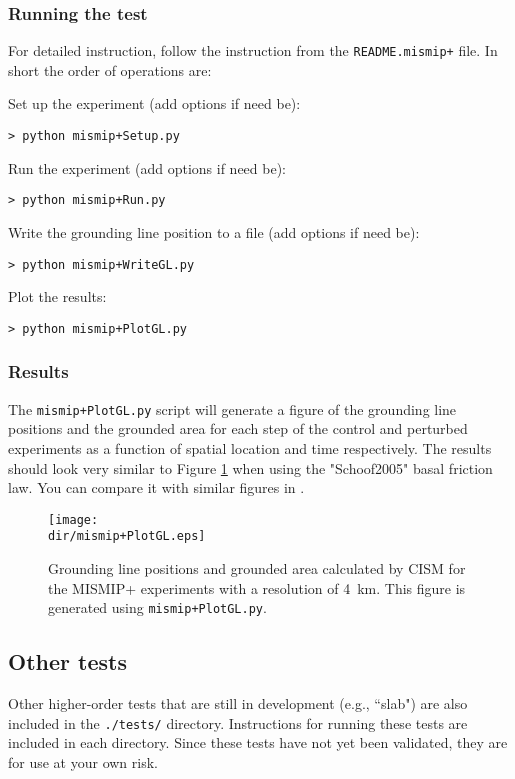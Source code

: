 \subsubsection{Running the test}
For detailed instruction, follow the instruction from the \texttt{README.mismip+} file. In short the order of operations are:

\noindent
Set up the experiment (add options if need be):

\texttt{> python mismip+Setup.py}

\noindent
Run the experiment (add options if need be):

\texttt{> python mismip+Run.py}

\noindent
Write the grounding line position to a file (add options if need be):

\texttt{> python mismip+WriteGL.py}

\noindent
Plot the results:

\texttt{> python mismip+PlotGL.py}


\subsubsection{Results}
The \texttt{mismip+PlotGL.py} script will generate a figure of the grounding line positions and the grounded area for each step of the control and perturbed experiments as a function of spatial location and time respectively. 
The results should look very similar to Figure \ref{fig:mismip+} when using the "Schoof2005" \citep{Schoof2005, Leguy2014} basal friction law. You can compare it with similar figures in \citet{AsayDavis2016}.

\begin{figure}[H]
	\centering
	\texttt{[image: \\dir/mismip+PlotGL.eps]}
	\caption{Grounding line positions and grounded area calculated by CISM for the MISMIP+ experiments with a resolution of 4~km. This figure is generated using \texttt{mismip+PlotGL.py}.}
	\label{fig:mismip+}
\end{figure}



\subsection{Other tests}
Other higher-order tests that are still in development (e.g., ``slab") are also included in the \texttt{./tests/}
directory. Instructions for running these tests are included in each directory. Since these tests have not yet been validated, 
they are for use at your own risk.

